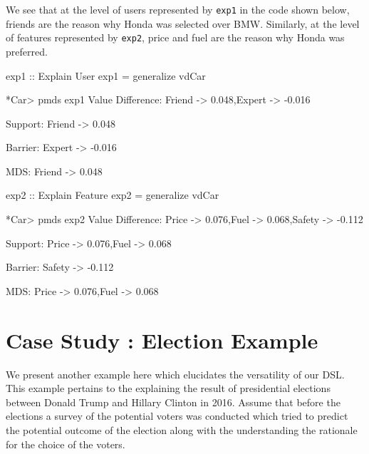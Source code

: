 \documentclass{jfp}
\newcommand{\prog}[1]{\texttt{#1}}
\begin{document}

We see that at the level of users represented by \prog{exp1} in the code shown below, friends are the reason why Honda was selected over BMW. Similarly, at the level of features represented by \prog{exp2}, price and fuel are the reason why Honda was preferred. 
\begin{haskellcode}
exp1 :: Explain User
exp1 = generalize vdCar

*Car> pmds exp1
Value Difference: {Friend -> 0.048,Expert -> -0.016}

Support: {Friend -> 0.048}

Barrier: {Expert -> -0.016}

MDS: {Friend -> 0.048}

exp2 :: Explain Feature
exp2 = generalize vdCar

*Car> pmds exp2
Value Difference: {Price -> 0.076,Fuel -> 0.068,Safety -> -0.112}

Support: {Price -> 0.076,Fuel -> 0.068}

Barrier: {Safety -> -0.112}

MDS: {Price -> 0.076,Fuel -> 0.068}
\end{haskellcode}

\section{Case Study : Election Example}
We present another example here which elucidates the versatility of our DSL. This example pertains to the explaining the result of presidential elections between Donald Trump and Hillary Clinton in 2016. Assume that before the elections a survey of the potential voters was conducted which tried to predict the potential outcome of the election along with the understanding the rationale for the choice of the voters. 
\end{document}
